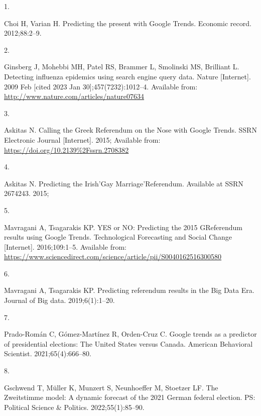 \documentclass[
  letterpaper,
  DIV=11,
  numbers=noendperiod]{scrartcl}
\newlength{\cslhangindent}
\newlength{\csllabelwidth}
\newlength{\cslentryspacingunit} %
\newenvironment{CSLReferences}[2] %
 {%
  \setlength{\parindent}{0pt}
  \ifodd #1
  \let\oldpar\par
  \def\par{\hangindent=\cslhangindent\oldpar}
  \fi
  \setlength{\parskip}{#2\cslentryspacingunit}
 }%
 {}
\newcommand{\CSLLeftMargin}[1]{\parbox[t]{\csllabelwidth}{#1}}
\newcommand{\CSLRightInline}[1]{\parbox[t]{\linewidth - \csllabelwidth}{#1}\break}
\begin{document}
\hypertarget{refs}{}
\begin{CSLReferences}{0}{0}
\leavevmode{}%
\CSLLeftMargin{1. }%
\CSLRightInline{Choi H, Varian H. Predicting the present with {Google}
{Trends}. Economic record. 2012;88:2--9. }

\leavevmode{}%
\CSLLeftMargin{2. }%
\CSLRightInline{Ginsberg J, Mohebbi MH, Patel RS, Brammer L, Smolinski
MS, Brilliant L. Detecting influenza epidemics using search engine query
data. Nature {[}Internet{]}. 2009 Feb {[}cited 2023 Jan
30{]};457(7232):1012--4. Available from:
\url{http://www.nature.com/articles/nature07634}}

\leavevmode{}%
\CSLLeftMargin{3. }%
\CSLRightInline{Askitas N. Calling the {Greek} {Referendum} on the
{Nose} with {Google} {Trends}. SSRN Electronic Journal {[}Internet{]}.
2015; Available from: \url{https://doi.org/10.2139\%2Fssrn.2708382}}

\leavevmode{}%
\CSLLeftMargin{4. }%
\CSLRightInline{Askitas N. Predicting the {Irish}'{Gay}
{Marriage}'{Referendum}. Available at SSRN 2674243. 2015; }

\leavevmode{}%
\CSLLeftMargin{5. }%
\CSLRightInline{Mavragani A, Tsagarakis KP. {YES} or {NO}: {Predicting}
the 2015 {GReferendum} results using {Google} {Trends}. Technological
Forecasting and Social Change {[}Internet{]}. 2016;109:1--5. Available
from:
\url{https://www.sciencedirect.com/science/article/pii/S0040162516300580}}

\leavevmode{}%
\CSLLeftMargin{6. }%
\CSLRightInline{Mavragani A, Tsagarakis KP. Predicting referendum
results in the {Big} {Data} {Era}. Journal of Big data. 2019;6(1):1--20.
}

\leavevmode{}%
\CSLLeftMargin{7. }%
\CSLRightInline{Prado-Román C, Gómez-Martínez R, Orden-Cruz C. Google
trends as a predictor of presidential elections: The {United} {States}
versus {Canada}. American Behavioral Scientist. 2021;65(4):666--80. }

\leavevmode{}%
\CSLLeftMargin{8. }%
\CSLRightInline{Gschwend T, Müller K, Munzert S, Neunhoeffer M, Stoetzer
LF. The {Zweitstimme} model: {A} dynamic forecast of the 2021 {German}
federal election. PS: Political Science \& Politics. 2022;55(1):85--90.
}


\end{CSLReferences}
\end{document}
